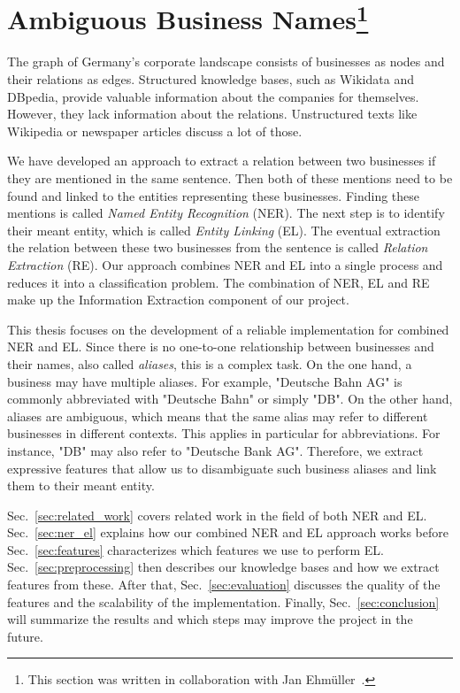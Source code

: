 \section[Ambiguous Business Names]{Ambiguous Business Names\protect\footnote{This section was written in collaboration with Jan Ehmüller~\cite{ehmueller}.}}
\label{sec:introduction}
The graph of Germany's corporate landscape consists of businesses as nodes and their relations as edges. Structured knowledge bases, such as Wikidata and DBpedia, provide valuable information about the companies for themselves. However, they lack information about the relations. Unstructured texts like Wikipedia or newspaper articles discuss a lot of those.

We have developed an approach to extract a relation between two businesses if they are mentioned in the same sentence. Then both of these mentions need to be found and linked to the entities representing these businesses. Finding these mentions is called \textit{Named Entity Recognition} (NER). The next step is to identify their meant entity, which is called \textit{Entity Linking} (EL). The eventual extraction the relation between these two businesses from the sentence is called \textit{Relation Extraction} (RE). Our approach combines NER and EL into a single process and reduces it into a classification problem. The combination of NER, EL and RE make up the Information Extraction component of our project.

This thesis focuses on the development of a reliable implementation for combined NER and EL. Since there is no one-to-one relationship between businesses and their names, also called \textit{aliases}, this is a complex task. On the one hand, a business may have multiple aliases. For example, "Deutsche Bahn AG" is commonly abbreviated with "Deutsche Bahn" or simply "DB". On the other hand, aliases are ambiguous, which means that the same alias may refer to different businesses in different contexts. This applies in particular for abbreviations. For instance, "DB" may also refer to "Deutsche Bank AG". Therefore, we extract expressive features that allow us to disambiguate such business aliases and link them to their meant entity.

Sec.~\ref{sec:related_work} covers related work in the field of both NER and EL. Sec.~\ref{sec:ner_el} explains how our combined NER and EL approach works before Sec.~\ref{sec:features} characterizes which features we use to perform EL. Sec.~\ref{sec:preprocessing} then describes our knowledge bases and how we extract features from these. After that, Sec.~\ref{sec:evaluation} discusses the quality of the features and the scalability of the implementation. Finally, Sec.~\ref{sec:conclusion} will summarize the results and which steps may improve the project in the future.
